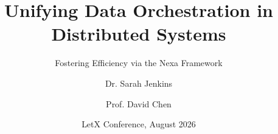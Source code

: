 

\usepackage{amsmath}
\usepackage{amssymb}
\usepackage{booktabs}
\usepackage{tikz}
\usepackage{fontawesome5}

\usetikzlibrary{positioning, calc, shapes.geometric, backgrounds}

\title[Nexa Data Orchestration]{Unifying Data Orchestration in Distributed Systems}
\subtitle{Fostering Efficiency via the Nexa Framework}
\author[Jenkins \& Chen]{Dr. Sarah Jenkins \and Prof. David Chen}
\date[LetX 2026]{LetX Conference, August 2026}
